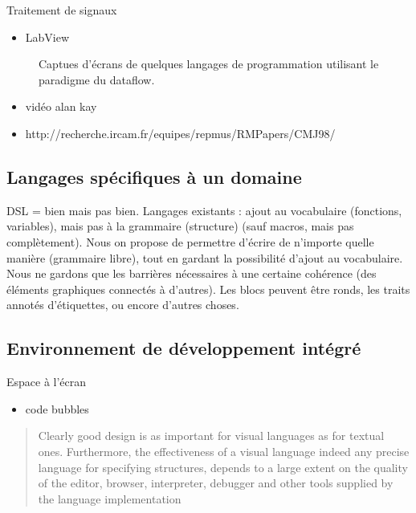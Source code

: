 \documentclass{article}
\begin{document}
Traitement de signaux
\begin{itemize}
\item LabView
\end{itemize}

\begin{figure}[htp!]
  \centering
  \caption{Captues d'écrans de quelques langages de programmation utilisant le paradigme du dataflow.}
  \label{fig:config/demar}
\end{figure}

\begin{itemize}
\item vidéo alan kay
\item http://recherche.ircam.fr/equipes/repmus/RMPapers/CMJ98/
\end{itemize}

\subsection{Langages spécifiques à un domaine}

DSL = bien mais pas bien. Langages existants : ajout au vocabulaire (fonctions, variables), mais pas à la grammaire (structure) (sauf
macros, mais pas complètement). Nous on propose de permettre d'écrire de n'importe quelle manière (grammaire libre), tout en gardant la
possibilité d'ajout au vocabulaire. Nous ne gardons que les barrières nécessaires à une certaine cohérence (des éléments graphiques
connectés à d'autres). Les blocs peuvent être ronds, les traits annotés d'étiquettes, ou encore d'autres choses.

\subsection{Environnement de développement intégré}

Espace à l'écran
\begin{itemize}
\item code bubbles
\end{itemize}
\begin{quotation}
  Clearly good design is as important for visual languages as for textual ones. Furthermore, the effectiveness of a visual language indeed
  any precise language for specifying structures, depends to a large extent on the quality of the editor, browser, interpreter, debugger and
  other tools supplied by the language implementation\cite{the-editor-is-as-important-as-the-language}
\end{quotation}
\end{document}
